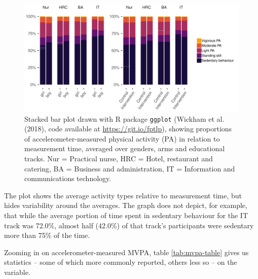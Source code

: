 \documentclass[british,man]{apa6}
\begin{document}
\begin{figure}
\centering
\includegraphics{_baseline-manuscript_files/figure-latex/average-day-activity-plot-1.pdf}
\caption{\label{fig:average-day-activity-plot}Stacked bar plot drawn with R package \texttt{ggplot} (Wickham et al. (2018), code available at \url{https://git.io/fptlp}), showing proportions of accelerometer-measured physical activity (PA) in relation to measurement time, averaged over genders, arms and educational tracks. Nur = Practical nurse, HRC = Hotel, restaurant and catering, BA = Business and administration, IT = Information and communications technology.}
\end{figure}

The plot shows the average activity types relative to measurement time, but hides variability around the averages. The graph does not depict, for example, that while the average portion of time spent in sedentary behaviour for the IT track was 72.0\%, almost half (42.0\%) of that track's participants were sedentary more than 75\% of the time.

Zooming in on accelerometer-measured MVPA, table \ref{tab:mvpa-table} gives us statistics -- some of which more commonly reported, others less so -- on the variable.
\end{document}
